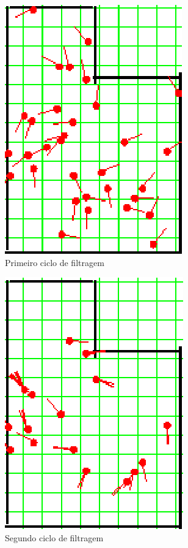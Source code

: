 \begin{figure}[H]
  \centering
  \includegraphics[scale=1]{figuras/cen4_ex4/2.eps}
  \caption[Primeiro Ciclo de Filtragem]{Primeiro ciclo de filtragem}
  \label{img:cen4_ex4_2}
\end{figure}

\begin{figure}[H]
  \centering
  \includegraphics[scale=1]{figuras/cen4_ex4/3.eps}
  \caption[Segundo Ciclo de Filtragem]{Segundo ciclo de filtragem}
  \label{img:cen4_ex4_3}
\end{figure}

